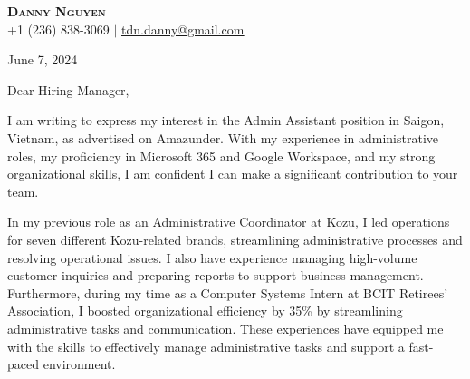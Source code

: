 \documentclass[letterpaper,11pt]{article}
\begin{document}
\begin{center}
\textbf{\Huge \scshape Danny Nguyen} \\ \vspace{1pt}
\small +1 (236) 838-3069 $|$ \href{mailto:tdn.danny@gmail.com}{\underline{tdn.danny@gmail.com}}
\end{center}

\vspace{20pt}
June 7, 2024

\vspace{20pt}

\vspace{10pt}
Dear Hiring Manager,

\vspace{10pt}
I am writing to express my interest in the Admin Assistant position in Saigon, Vietnam, as advertised on Amazunder. With my experience in administrative roles, my proficiency in Microsoft 365 and Google Workspace, and my strong organizational skills, I am confident I can make a significant contribution to your team.

\vspace{10pt}
In my previous role as an Administrative Coordinator at Kozu, I led operations for seven different Kozu-related brands, streamlining administrative processes and resolving operational issues. I also have experience managing high-volume customer inquiries and preparing reports to support business management. Furthermore, during my time as a Computer Systems Intern at BCIT Retirees' Association, I boosted organizational efficiency by 35\% by streamlining administrative tasks and communication. These experiences have equipped me with the skills to effectively manage administrative tasks and support a fast-paced environment.
\end{document}
